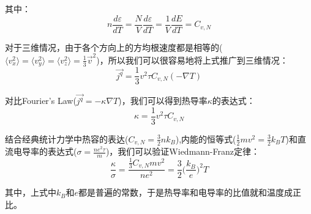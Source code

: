 \documentclass{ctexart}
\begin{document}
                其中：
                \begin{equation}
                    n\frac{d\varepsilon}{dT}=\frac{N}{V}\frac{d\varepsilon}{dT}=\frac{1}{V}\frac{dE}{dT}=C_{v,N}
                \end{equation}
                
                对于三维情况，由于各个方向上的方均根速度都是相等的($\langle v_x^2\rangle=\langle v_y^2\rangle=\langle v_z^2\rangle=\frac{1}{3}\vec{v}^2$)，所以我们可以很容易地将上式推广到三维情况：
                \begin{equation}
                    \vec{j^q}=\frac{1}{3}v^2\tau C_{v,N}(-\nabla T)
                \end{equation}
                
                对比Fourier's Law($\vec{j^q}=-\kappa\nabla T$)，我们可以得到热导率$\kappa$的表达式：
                \begin{equation}
                    \kappa=\frac{1}{3}v^2\tau C_{v,N}
                \end{equation}
                
                结合经典统计力学中热容的表达($C_{v,N}=\frac{3}{2}nk_B$),内能的恒等式($\frac{1}{2}mv^2=\frac{3}{2}k_BT$)和直流电导率的表达式($\sigma=\frac{ne^2\tau}{m}$)，我们可以验证Wiedmann-Franz定律：
                \begin{equation}
                    \frac{\kappa}{\sigma}=\frac{\frac{1}{3}C_{v,N}mv^2}{ne^2}=\frac{3}{2}\Big(\frac{k_B}{e}\Big)^2T
                \end{equation}
                
                其中，上式中$k_B$和$e$都是普遍的常数，于是热导率和电导率的比值就和温度成正比。
\end{document}
